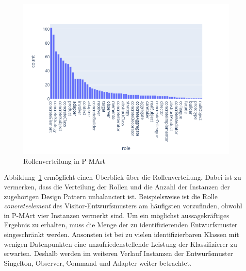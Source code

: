 \pagebreak

\begin{figure}[h]
    \centering
    \includegraphics[scale=0.6]{figures/role_dist.png}
    \caption{Rollenverteilung in P-MArt}
    \label{fig:role_dist}
\end{figure}

Abbildung~\ref{fig:role_dist} ermöglicht einen Überblick über die Rollenverteilung.
Dabei ist zu vermerken, dass die Verteilung der Rollen und die Anzahl der Instanzen der zugehörigen Design Pattern unbalanciert ist. Beispielsweise ist die Rolle \textit{concreteelement} des Visitor-Entwurfsmusters am häufigsten vorzufinden, obwohl in P-MArt vier Instanzen vermerkt sind.
Um ein möglichst aussagekräftiges Ergebnis zu erhalten, muss die Menge der zu identifizierenden Entwurfsmuster eingeschränkt werden. Ansonsten ist bei zu vielen identifizierbaren Klassen mit wenigen Datenpunkten eine unzufriedenstellende Leistung der Klassifizierer zu erwarten.
Deshalb werden im weiteren Verlauf Instanzen der Entwurfsmuster Singelton, Observer, Command und Adapter weiter betrachtet.


